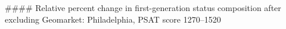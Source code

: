 #### Relative percent change in first-generation status composition after excluding Geomarket: Philadelphia, PSAT score 1270–1520
